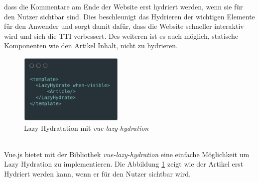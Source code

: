 \documentclass[runningheads]{llncs}
\numberwithin{figure}{section}
\begin{document}
dass die Kommentare am Ende der Website erst hydriert werden, 
wenn sie für den Nutzer sichtbar sind. 
Dies beschleunigt das Hydrieren der wichtigen Elemente für den Anwender und sorgt damit dafür, 
dass die Website schneller interaktiv wird und sich die TTI verbessert. 
Des weiteren ist es auch möglich, 
statische Komponenten wie den Artikel Inhalt, nicht zu hydrieren.
\begin{figure}[h]
  \centering
  \includegraphics[width=5cm]{images/LazyHydration}
  \caption{Lazy Hydratation mit \textit{vue-lazy-hydration}}
  \label{Lazy Hydratation mit vue-lazy-hydration}
\end{figure}
\\
Vue.js bietet mit der Bibliothek \textit{vue-lazy-hydration }
eine einfache Möglichkeit um Lazy Hydration zu implementieren. 
Die Abbildung \ref{Lazy Hydratation mit vue-lazy-hydration} zeigt wie der Artikel erst Hydriert werden kann, 
wenn er für den Nutzer sichtbar wird. \cite{maoberlehner_2018}
\end{document}
